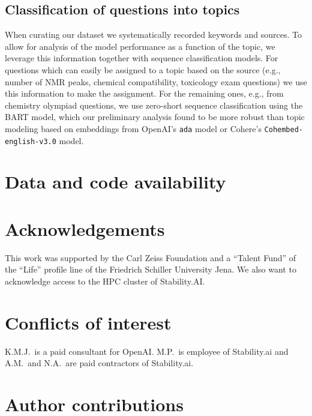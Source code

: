 \documentclass[11pt, oneside]{article}
\begin{document}
\subsection{Classification of questions into topics} \label{sec:meth-topic} When curating our dataset we systematically recorded keywords and sources. 
To allow for analysis of the model performance as a function of the topic, we leverage this information together with sequence classification models. 
For questions which can easily be assigned to a topic based on the source (e.g., number of NMR peaks, chemical compatibility, toxicology exam questions) we use this information to make the assignment. 
For the remaining ones, e.g., from chemistry olympiad questions, we use zero-short sequence classification\cite{zeroshotsequence} using the BART model\cite{bart, FacebookBART}, which our preliminary analysis found to be more robust than topic modeling based on embeddings from OpenAI's \texttt{ada} model or Cohere's \texttt{Cohembed-english-v3.0} model. 




\section*{Data and code availability} 

\section*{Acknowledgements}
This work was supported by the Carl Zeiss Foundation and a \enquote{Talent Fund} of the \enquote{Life} profile line of the Friedrich Schiller University Jena.
We also want to acknowledge access to the HPC cluster of Stability.AI.

\section*{Conflicts of interest}
K.M.J.\ is a paid consultant for OpenAI. M.P.\ is employee of Stability.ai and A.M.\ and N.A.\ are paid contractors of Stability.ai.

\section*{Author contributions}
\end{document}
